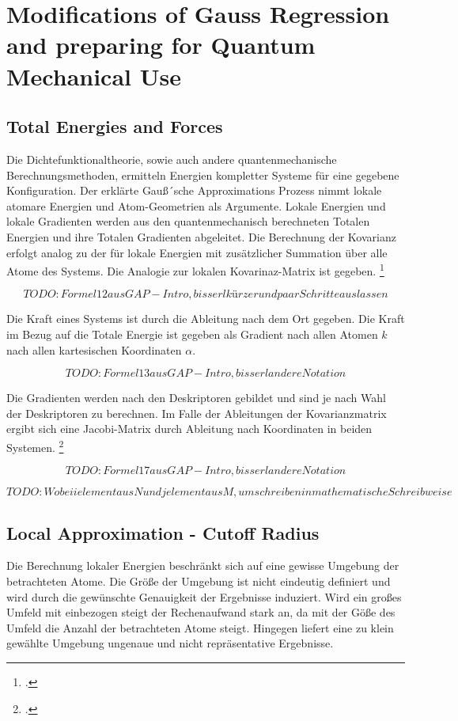 \section{Modifications of Gauss Regression and preparing for Quantum Mechanical Use}


\subsection{Total Energies and Forces}

Die Dichtefunktionaltheorie, sowie auch andere quantenmechanische Berechnungsmethoden, ermitteln Energien kompletter Systeme für eine gegebene Konfiguration. Der erklärte Gauß´sche Approximations Prozess nimmt lokale atomare Energien und Atom-Geometrien als Argumente. Lokale Energien und lokale Gradienten werden aus den quantenmechanisch berechneten Totalen Energien und ihre Totalen Gradienten abgeleitet. Die Berechnung der Kovarianz erfolgt analog zu der für lokale Energien mit zusätzlicher Summation über alle Atome des Systems. Die Analogie zur lokalen Kovarinaz-Matrix ist gegeben. \footcite[1053]{GAP-intro}


$$TODO: Formel 12 aus GAP-Intro, bisserl kürzer und paar Schritte auslassen $$

Die Kraft eines Systems ist durch die Ableitung nach dem Ort gegeben. Die Kraft im Bezug auf die Totale Energie ist gegeben als Gradient nach allen Atomen $k$ nach allen kartesischen Koordinaten $\alpha$. 

$$TODO: Formel 13 aus GAP-Intro, bisserl andere Notation$$

Die Gradienten werden nach den Deskriptoren gebildet und sind je nach Wahl der Deskriptoren zu berechnen. Im Falle der Ableitungen der Kovarianzmatrix ergibt sich eine Jacobi-Matrix durch Ableitung nach Koordinaten in beiden Systemen. \footcite[1053]{GAP-intro}


$$TODO: Formel 17 aus GAP-Intro, bisserl andere Notation$$

$$TODO: Wobei i element aus N und j element aus M, umschreiben in mathematische Schreibweise$$






\subsection{Local Approximation - Cutoff Radius}

Die Berechnung lokaler Energien beschränkt sich auf eine gewisse Umgebung der betrachteten Atome. Die Größe der Umgebung ist nicht eindeutig definiert und wird durch die gewünschte Genauigkeit der Ergebnisse induziert. Wird ein großes Umfeld mit einbezogen steigt der Rechenaufwand stark an, da mit der Göße des Umfeld die Anzahl der betrachteten Atome steigt. Hingegen liefert eine zu klein gewählte Umgebung ungenaue und nicht repräsentative Ergebnisse. 

